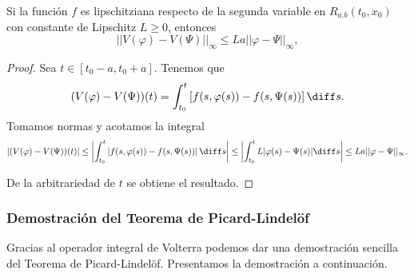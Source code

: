 \documentclass{article}
\begin{document}
\begin{lemma}
  Si la función $f$ es lipschitziana respecto de la segunda variable en $R_{a.b}(t_0, x_0)$ con
  constante de Lipschitz $L \ge 0$, entonces
  \[||V(\varphi) - V(\Psi)||_{\infty} \le La||\varphi - \Psi||_\infty,\]
\end{lemma}

\begin{proof}
  Sea $t \in [t_0-a, t_0+a]$. Tenemos que
  \[ (V(\varphi) - V(\Psi))(t) = \int_{t_{0}}^t \left[f(s, \varphi(s)) - f(s, \Psi(s))\right] \diff
    s.\] Tomamos normas y acotamos la integral
  \[|(V(\varphi) - V(\Psi))(t)| \le \left|\int_{t_{0}}^t \left|f(s, \varphi(s)) - f(s,
        \Psi(s))\right| \diff s\right| \le \left|\int_{t_{0}}^t L |\varphi(s) - \Psi(s)| \diff s
    \right| \le L a ||\varphi - \Psi||_{\infty}.\]

  De la arbitrariedad de $t$ se obtiene el resultado.
\end{proof}

\subsubsection{Demostración del Teorema de Picard-Lindelöf}

Gracias al operador integral de Volterra podemos dar una demostración sencilla del Teorema de
Picard-Lindelöf. Presentamos la demostración a continuación.
\end{document}
